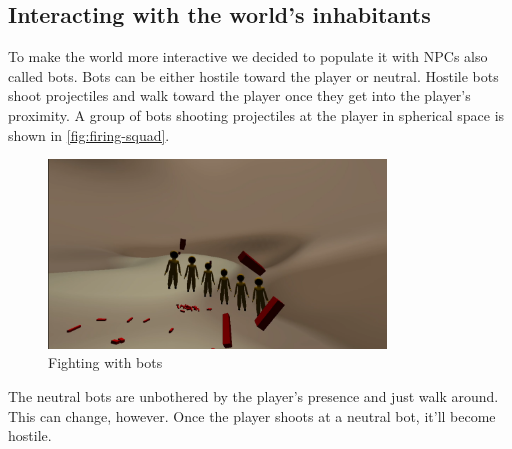 \subsection{Interacting with the world's inhabitants}
To make the world more interactive we decided to populate it with NPCs also called bots.
Bots can be either hostile toward the player or neutral.
Hostile bots shoot projectiles and walk toward the player once they get into the player's proximity.
A group of bots shooting projectiles at the player in spherical space is shown in \autoref{fig:firing-squad}.
\begin{figure}[!htb]
    \centering
    \includegraphics[width=0.8\textwidth]{chapters/results/sections/gameplay/resources/firing-squad.png}
    \caption{Fighting with bots}
    \label{fig:firing-squad}
\end{figure}
The neutral bots are unbothered by the player's presence and just walk around.
This can change, however.
Once the player shoots at a neutral bot, it'll become hostile.